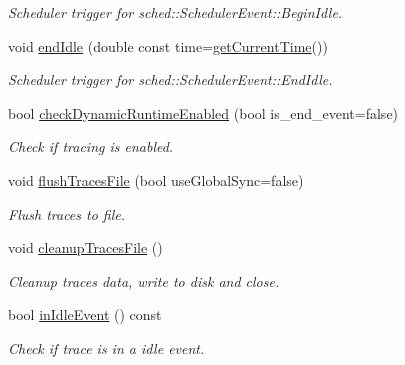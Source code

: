 \begin{DoxyCompactItemize}
\begin{DoxyCompactList}\small\item\em Scheduler trigger for {\ttfamily sched\+::\+Scheduler\+Event\+::\+Begin\+Idle}. \end{DoxyCompactList}\item 
void \hyperlink{structvt_1_1trace_1_1_trace_lite_a72c44d3d5e8361560104f8b91332a22c}{end\+Idle} (double const time=\hyperlink{structvt_1_1trace_1_1_trace_lite_ad1d8159d645a3b7047ce3f2e0c080f8d}{get\+Current\+Time}())
\begin{DoxyCompactList}\small\item\em Scheduler trigger for {\ttfamily sched\+::\+Scheduler\+Event\+::\+End\+Idle}. \end{DoxyCompactList}\item 
bool \hyperlink{structvt_1_1trace_1_1_trace_lite_a8c80920e23cef1aeedbb2282fb6769f2}{check\+Dynamic\+Runtime\+Enabled} (bool is\+\_\+end\+\_\+event=false)
\begin{DoxyCompactList}\small\item\em Check if tracing is enabled. \end{DoxyCompactList}\item 
void \hyperlink{structvt_1_1trace_1_1_trace_lite_a31513ed82d3b3c74369fde81491eb3a2}{flush\+Traces\+File} (bool use\+Global\+Sync=false)
\begin{DoxyCompactList}\small\item\em Flush traces to file. \end{DoxyCompactList}\item 
void \hyperlink{structvt_1_1trace_1_1_trace_lite_ac412f235b5e5b4510d848fa0b3b6a539}{cleanup\+Traces\+File} ()
\begin{DoxyCompactList}\small\item\em Cleanup traces data, write to disk and close. \end{DoxyCompactList}\item 
bool \hyperlink{structvt_1_1trace_1_1_trace_lite_ad3b81920d008e46dff0eb205ca99bd22}{in\+Idle\+Event} () const
\begin{DoxyCompactList}\small\item\em Check if trace is in a idle event. \end{DoxyCompactList}\end{DoxyCompactItemize}
